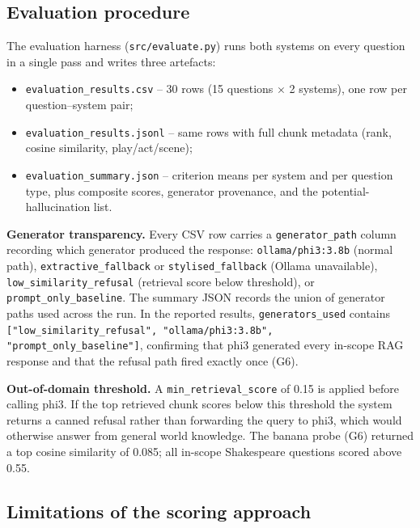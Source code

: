 \documentclass[10pt,conference]{IEEEtran}
\begin{document}
\subsection{Evaluation procedure}

The evaluation harness (\verb|src/evaluate.py|) runs both systems on
every question in a single pass and writes three artefacts:

\begin{itemize}
    \item \verb|evaluation_results.csv| -- 30 rows
        (15 questions $\times$ 2 systems), one row per
        question--system pair;
    \item \verb|evaluation_results.jsonl| -- same rows with full
        chunk metadata (rank, cosine similarity, play/act/scene);
    \item \verb|evaluation_summary.json| -- criterion means per
        system and per question type, plus composite scores,
        generator provenance, and the potential-hallucination list.
\end{itemize}

\textbf{Generator transparency.} Every CSV row carries a
\texttt{generator\_path} column recording which generator produced
the response: \texttt{ollama/phi3:3.8b} (normal path),
\texttt{extractive\_fallback} or \texttt{stylised\_fallback} (Ollama
unavailable), \texttt{low\_similarity\_refusal} (retrieval score
below threshold), or \texttt{prompt\_only\_baseline}. The summary
JSON records the union of generator paths used across the run.
In the reported results, \texttt{generators\_used} contains
\texttt{["low\_similarity\_refusal", "ollama/phi3:3.8b",
"prompt\_only\_baseline"]}, confirming that phi3 generated every
in-scope RAG response and that the refusal path fired exactly once
(G6).

\textbf{Out-of-domain threshold.}
A \texttt{min\_retrieval\_score} of 0.15 is applied before calling
phi3. If the top retrieved chunk scores below this threshold the
system returns a canned refusal rather than forwarding the query to
phi3, which would otherwise answer from general world knowledge. The
banana probe (G6) returned a top cosine similarity of 0.085;
all in-scope Shakespeare questions scored above 0.55.

\subsection{Limitations of the scoring approach}
\end{document}
